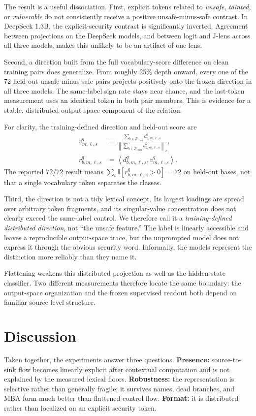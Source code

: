 \documentclass{article}
\begin{document}
The result is a useful dissociation. First, explicit tokens related to \emph{unsafe}, \emph{tainted}, or \emph{vulnerable} do not consistently receive a positive unsafe-minus-safe contrast. In DeepSeek 1.3B, the explicit-security contrast is significantly inverted. Agreement between projections on the DeepSeek models, and between logit and J-lens across all three models, makes this unlikely to be an artifact of one lens.

Second, a direction built from the full vocabulary-score difference on clean training pairs does generalize. From roughly 25\% depth onward, every one of the 72 held-out unsafe-minus-safe pairs projects positively onto the frozen direction in all three models. The same-label sign rate stays near chance, and the last-token measurement uses an identical token in both pair members. This is evidence for a stable, distributed output-space component of the relation.

For clarity, the training-defined direction and held-out score are
\begin{align}
 v_{m,\ell,s}^{q}
 &=\frac{\sum_{b\in\mathcal{B}_{\mathrm{train}}}d_{b,m,\ell,s}^{q}}
 {\left\|\sum_{b\in\mathcal{B}_{\mathrm{train}}}d_{b,m,\ell,s}^{q}\right\|_2},
 \label{eq:direction}\\
 r_{b,m,\ell,s}^{q}
 &=\left\langle d_{b,m,\ell,s}^{q},v_{m,\ell,s}^{q}\right\rangle .
 \label{eq:projection}
\end{align}
The reported 72/72 result means
$\sum_b\mathbb{I}[r_{b,m,\ell,s}^{q}>0]=72$ on held-out bases, not that a
single vocabulary token separates the classes.

Third, the direction is not a tidy lexical concept. Its largest loadings are spread over arbitrary token fragments, and its singular-value concentration does not clearly exceed the same-label control. We therefore call it a \emph{training-defined distributed direction}, not ``the unsafe feature.'' The label is linearly accessible and leaves a reproducible output-space trace, but the unprompted model does not express it through the obvious security word. Informally, the models represent the distinction more reliably than they name it.

Flattening weakens this distributed projection as well as the hidden-state classifier. Two different measurements therefore locate the same boundary: the output-space organization and the frozen supervised readout both depend on familiar source-level structure.

\section{Discussion}
Taken together, the experiments answer three questions. \textbf{Presence:} source-to-sink flow becomes linearly explicit after contextual computation and is not explained by the measured lexical floors. \textbf{Robustness:} the representation is selective rather than generally fragile; it survives names, dead branches, and MBA form much better than flattened control flow. \textbf{Format:} it is distributed rather than localized on an explicit security token.
\end{document}
